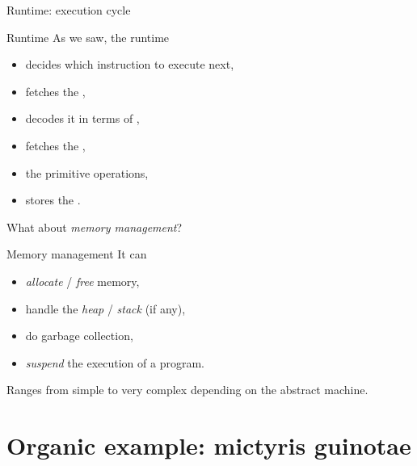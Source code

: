 \documentclass[10pt]{beamer}
\begin{document}
\begin{frame}{Runtime: execution cycle}
  


\end{frame}



\begin{frame}{Runtime}
  As we saw, the runtime
  \smallskip
  \begin{itemize}
  \item decides which instruction to execute next,
  \item fetches the ,
  \item decodes it in terms of ,
  \item fetches the ,
  \item {} the primitive operations,
  \item stores the .
  \end{itemize}

  \bigskip
  \pause

  What about \emph{memory management}?
\end{frame}




\begin{frame}{Memory management}
  It can
  \smallskip
  \begin{itemize}
  \item \emph{allocate} / \emph{free} memory,
  \item handle the \emph{heap} / \emph{stack} (if any),
  \item do garbage collection,
  \item \emph{suspend} the execution of a program.
  \end{itemize}

  \pause
  \bigskip

  Ranges from simple to very complex depending on the abstract machine.
\end{frame}




\section{Organic example: mictyris guinotae}
\end{document}
